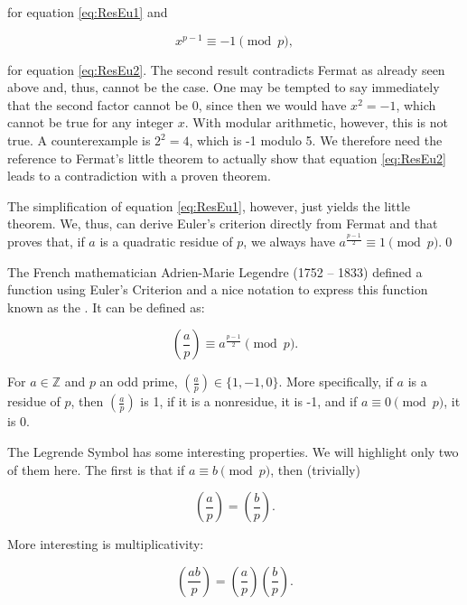 \documentclass{scrreprt}
\begin{document}
for equation \ref{eq:ResEu1} and

\begin{equation} 
x^{p-1} \equiv -1 \pmod{p},
\end{equation} 

for equation \ref{eq:ResEu2}.
The second result contradicts Fermat as already seen above
and, thus, cannot be the case.
One may be tempted to say immediately that the second factor
cannot be 0, since then we would have $x^2 = -1$, which
cannot be true for any integer $x$.
With modular arithmetic, however, this is not true.
A counterexample is $2^2 = 4$, which is -1 modulo 5.
We therefore need the reference to Fermat's little theorem
to actually show that equation \ref{eq:ResEu2} leads to
a contradiction with a proven theorem.

The simplification of equation \ref{eq:ResEu1}, however, 
just yields the little theorem.
We, thus, can derive Euler's criterion
directly from Fermat and that proves that, 
if $a$ is a quadratic residue of $p$, 
we always have
$a^{\frac{p-1}{2}} \equiv 1 \pmod{p}$.\qed

The French mathematician Adrien-Marie Legendre (1752 -- 1833)
defined a function using Euler's Criterion
and a nice notation to express this function
known as the .
It can be defined as:

\begin{equation}
\left(\frac{a}{p}\right) \equiv a^{\frac{p-1}{2}} \pmod{p}.
\end{equation}

For $a \in \mathbb{Z}$ and $p$ an odd prime,
$\left(\frac{a}{p}\right) \in \lbrace 1,-1,0\rbrace$.
More specifically, if $a$ is a residue of $p$,
then $\left(\frac{a}{p}\right)$ is 1,
if it is a nonresidue, it is -1, and if $a \equiv 0 \pmod{p}$,
it is 0.

The Legrende Symbol has some interesting properties.
We will highlight only two of them here.
The first is that if $a \equiv b \pmod{p}$, then (trivially)

\begin{equation}
\left(\frac{a}{p}\right) = \left(\frac{b}{p}\right).
\end{equation}

More interesting is multiplicativity:

\begin{equation}
\left(\frac{ab}{p}\right) = 
\left(\frac{a}{p}\right) \left(\frac{b}{p}\right).
\end{equation}
\end{document}
